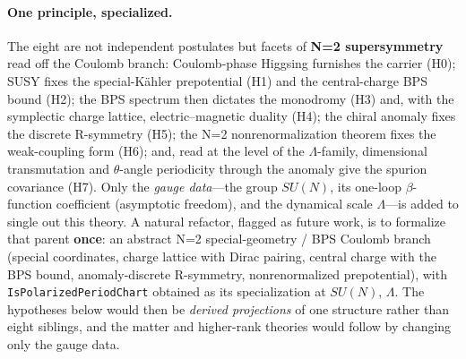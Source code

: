 \documentclass{article}
\theoremstyle{plain}
\theoremstyle{definition}
\numberwithin{equation}{section}
\newcommand{\code}[1]{\texttt{#1}}
\begin{document}
\paragraph{One principle, specialized.} The eight are not independent postulates but facets of
\textbf{N=2 supersymmetry} read off the Coulomb branch: Coulomb-phase Higgsing furnishes the
carrier (H0); SUSY fixes the special-K\"ahler prepotential
(H1) and the central-charge BPS bound (H2); the BPS spectrum then dictates the monodromy (H3) and,
with the symplectic charge lattice, electric--magnetic duality (H4); the chiral anomaly fixes the
discrete R-symmetry (H5); the N=2 nonrenormalization theorem fixes the weak-coupling form (H6);
and, read at the level of the $\Lambda$-family, dimensional transmutation and $\theta$-angle
periodicity through the anomaly give the spurion covariance (H7).
Only the \emph{gauge data}---the group $SU(N)$, its one-loop $\beta$-function coefficient (asymptotic
freedom), and the dynamical scale $\Lambda$---is added to single out this theory. A natural refactor,
flagged as future work, is to formalize that parent \textbf{once}: an abstract N=2 special-geometry /
BPS Coulomb branch (special coordinates, charge lattice with Dirac pairing, central charge with the
BPS bound, anomaly-discrete R-symmetry, nonrenormalized prepotential), with \code{IsPolarizedPeriodChart}
obtained as its specialization at $SU(N)$, $\Lambda$. The hypotheses below would then be \emph{derived
projections} of one structure rather than eight siblings, and the matter and higher-rank theories
would follow by changing only the gauge data.
\end{document}
